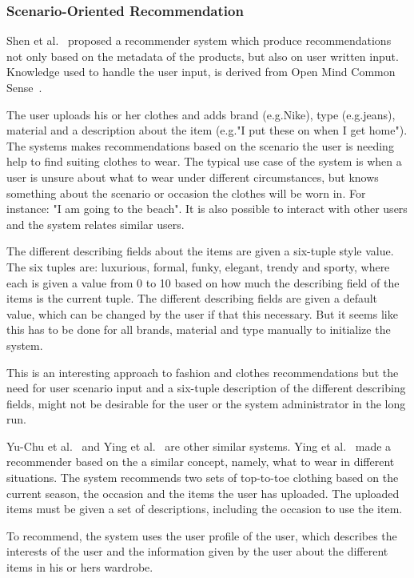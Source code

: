 \subsubsection{Scenario-Oriented Recommendation}
    Shen et al.~\cite{Shen:2007:AIG:1216295.1216368} proposed a recommender system which produce recommendations not only based on the metadata of the products, but also on user written input.
    Knowledge used to handle the user input, is derived from Open Mind Common Sense~\cite{Singh02openmind}.

    The user uploads his or her clothes and adds brand (e.g.Nike), type (e.g.jeans), material and a description about the item (e.g."I put these on when I get home").
    The systems makes recommendations based on the scenario the user is needing help to find suiting clothes to wear.
    The typical use case of the system is when a user is unsure about what to wear under different circumstances, but knows something about the scenario or occasion the clothes will be worn in.
    For instance: "I am going to the beach".
    It is also possible to interact with other users and the system relates similar users.

    The different describing fields about the items are given a six-tuple style value.
    The six tuples are: luxurious, formal, funky, elegant, trendy and sporty, where each is given a value from 0 to 10 based on how much the describing field of the items is the current tuple.
    The different describing fields are given a default value, which can be changed by the user if that this necessary. But it seems like this has to be done for all brands, material and type manually to initialize the system.

    This is an interesting approach to fashion and clothes recommendations but the need for user scenario input and a six-tuple description of the different describing fields, might not be desirable for the user or the system administrator in the long run.

    Yu-Chu et al.~\cite{Yu-Chu:2012:PCS:2376365.2376961} and Ying et al.~\cite{Ying2011} are other similar systems. Ying et al.~\cite{Ying2011} made a recommender based on the a similar concept, namely, what to wear in different situations.
    The system recommends two sets of top-to-toe clothing based on the current season, the occasion and the items the user has uploaded.
    The uploaded items must be given a set of descriptions, including the occasion to use the item.

    To recommend, the system uses the user profile of the user, which describes the interests of the user and the information given by the user about the different items in his or hers wardrobe.

